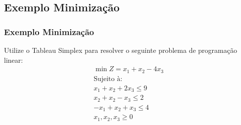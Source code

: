 \subsection{Exemplo Minimização}

\begin{frame}
	\frametitle{Exemplo Minimização}
	\begin{block}{Utilize o Tableau Simplex para resolver o seguinte problema de programação linear:}
		\begin{equation*}
			\begin{matrix}
				\min Z = x_1 + x_2 - 4x_3 \\
				\text{Sujeito à:} \\
				x_1 + x_2 + 2x_3 \le 9 \\
				x_2 + x_2 - x_3 \le 2 \\
				-x_1 + x_2 + x_3 \le 4 \\
				x_1, x_2, x_3 \ge 0 \\
			\end{matrix}
		\end{equation*}
	\end{block}
\end{frame}

